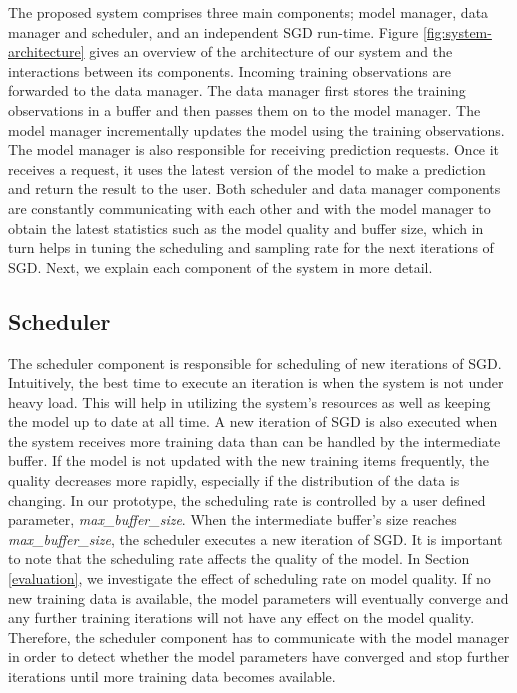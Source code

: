 \documentclass{vldb}
\begin{document}
The proposed system comprises three main components; model manager, data manager and scheduler, and an independent SGD run-time. 
Figure \ref{fig:system-architecture} gives an overview of the architecture of our system and the interactions between its components.
Incoming training observations are forwarded to the data manager.
The data manager first stores the training observations in a buffer and then passes them on to the model manager.
The model manager incrementally updates the model using the training observations.
The model manager is also responsible for receiving prediction requests.
Once it receives a request, it uses the latest version of the model to make a prediction and return the result to the user.
Both scheduler and data manager components are constantly communicating with each other and with the model manager to obtain the latest statistics such as the model quality and buffer size, which in turn helps in tuning the scheduling and sampling rate for the next iterations of SGD. 
Next, we explain each component of the system in more detail.

\subsection{Scheduler}\label{scheduler}
The scheduler component is responsible for scheduling of new iterations of SGD.
Intuitively, the best time to execute an iteration is when the system is not under heavy load.
This will help in utilizing the system's resources as well as keeping the model up to date at all time.
A new iteration of SGD is also executed when the system receives more training data than can be handled by the intermediate buffer.
If the model is not updated with the new training items frequently, the quality decreases more rapidly, especially if the distribution of the data is changing.
In our prototype, the scheduling rate is controlled by a user defined parameter, \textit{max\_buffer\_size}.
When the intermediate buffer's size reaches \textit{max\_buffer\_size}, the scheduler executes a new iteration of SGD.
It is important to note that the scheduling rate affects the quality of the model.
In Section \ref{evaluation}, we investigate the effect of scheduling rate on model quality.
If no new training data is available, the model parameters will eventually converge and any further training iterations will not have any effect on the model quality.
Therefore, the scheduler component has to communicate with the model manager in order to detect whether the model parameters have converged and stop further iterations until more training data becomes available.
\end{document}
